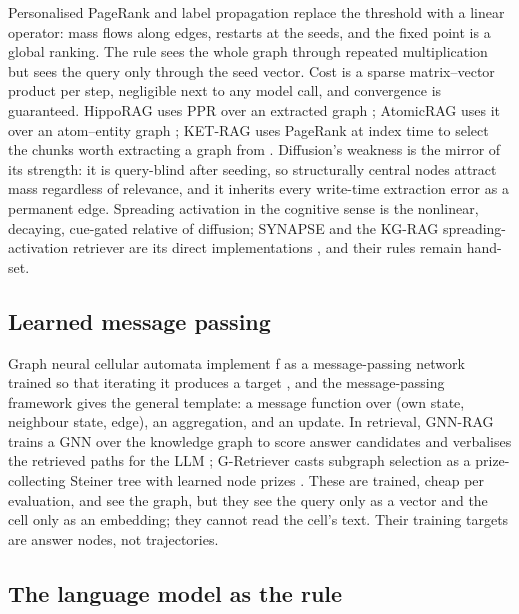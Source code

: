 \documentclass[11pt]{article}
\begin{document}
Personalised PageRank \cite{brin1998,jeh2003} and label propagation replace the threshold with a linear operator: mass flows along edges, restarts at the seeds, and the fixed point is a global ranking. The rule sees the whole graph through repeated multiplication but sees the query only through the seed vector. Cost is a sparse matrix--vector product per step, negligible next to any model call, and convergence is guaranteed. HippoRAG uses PPR over an extracted graph \cite{hipporag,hipporag2}; AtomicRAG uses it over an atom--entity graph \cite{atomicrag}; KET-RAG uses PageRank at index time to select the chunks worth extracting a graph from \cite{ketrag}. Diffusion's weakness is the mirror of its strength: it is query-blind after seeding, so structurally central nodes attract mass regardless of relevance, and it inherits every write-time extraction error as a permanent edge. Spreading activation in the cognitive sense \cite{collins1975,anderson1983} is the nonlinear, decaying, cue-gated relative of diffusion; SYNAPSE and the KG-RAG spreading-activation retriever are its direct implementations \cite{synapse,pavlovic2025}, and their rules remain hand-set.

\subsection{Learned message passing}

Graph neural cellular automata implement f as a message-passing network trained so that iterating it produces a target \cite{gnca,egnca}, and the message-passing framework \cite{gilmer2017} gives the general template: a message function over (own state, neighbour state, edge), an aggregation, and an update. In retrieval, GNN-RAG trains a GNN over the knowledge graph to score answer candidates and verbalises the retrieved paths for the LLM \cite{gnnrag}; G-Retriever casts subgraph selection as a prize-collecting Steiner tree with learned node prizes \cite{gretriever}. These are trained, cheap per evaluation, and see the graph, but they see the query only as a vector and the cell only as an embedding; they cannot read the cell's text. Their training targets are answer nodes, not trajectories.

\subsection{The language model as the rule}
\end{document}
